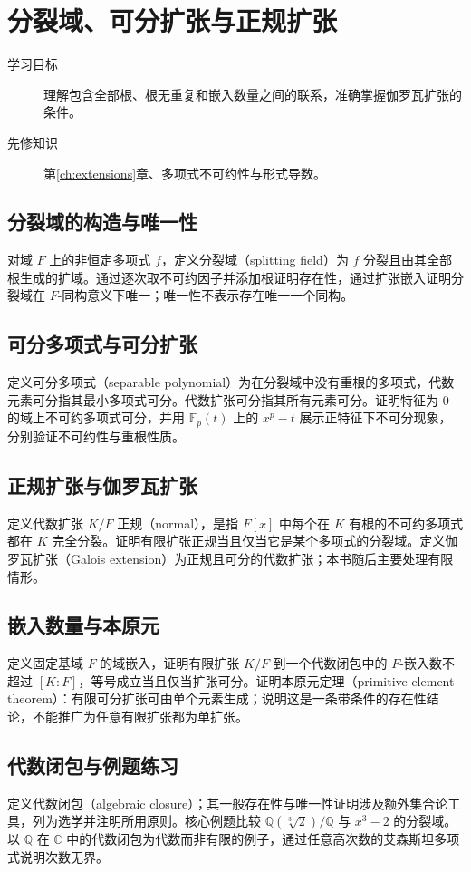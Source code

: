 \setcounter{chapter}{15} %
\chapter{分裂域、可分扩张与正规扩张}\label{ch:splitting}

\begin{description}
  \item[学习目标] 理解包含全部根、根无重复和嵌入数量之间的联系，准确掌握伽罗瓦扩张的条件。
  \item[先修知识] 第\ref{ch:extensions}章、多项式不可约性与形式导数。
\end{description}

\section{分裂域的构造与唯一性}
对域 $F$ 上的非恒定多项式 $f$，定义分裂域（splitting field）为 $f$ 分裂且由其全部根生成的扩域。通过逐次取不可约因子并添加根证明存在性，通过扩张嵌入证明分裂域在 $F$-同构意义下唯一；唯一性不表示存在唯一一个同构。

\section{可分多项式与可分扩张}
定义可分多项式（separable polynomial）为在分裂域中没有重根的多项式，代数元素可分指其最小多项式可分。代数扩张可分指其所有元素可分。证明特征为 $0$ 的域上不可约多项式可分，并用 $\mathbb F_p(t)$ 上的 $x^p-t$ 展示正特征下不可分现象，分别验证不可约性与重根性质。

\section{正规扩张与伽罗瓦扩张}
定义代数扩张 $K/F$ 正规（normal），是指 $F[x]$ 中每个在 $K$ 有根的不可约多项式都在 $K$ 完全分裂。证明有限扩张正规当且仅当它是某个多项式的分裂域。定义伽罗瓦扩张（Galois extension）为正规且可分的代数扩张；本书随后主要处理有限情形。

\section{嵌入数量与本原元}
定义固定基域 $F$ 的域嵌入，证明有限扩张 $K/F$ 到一个代数闭包中的 $F$-嵌入数不超过 $[K:F]$，等号成立当且仅当扩张可分。证明本原元定理（primitive element theorem）：有限可分扩张可由单个元素生成；说明这是一条带条件的存在性结论，不能推广为任意有限扩张都为单扩张。

\section{代数闭包与例题练习}
定义代数闭包（algebraic closure）；其一般存在性与唯一性证明涉及额外集合论工具，列为选学并注明所用原则。核心例题比较 $\mathbb Q(\sqrt[3]{2})/\mathbb Q$ 与 $x^3-2$ 的分裂域。以 $\mathbb Q$ 在 $\mathbb C$ 中的代数闭包为代数而非有限的例子，通过任意高次数的艾森斯坦多项式说明次数无界。

